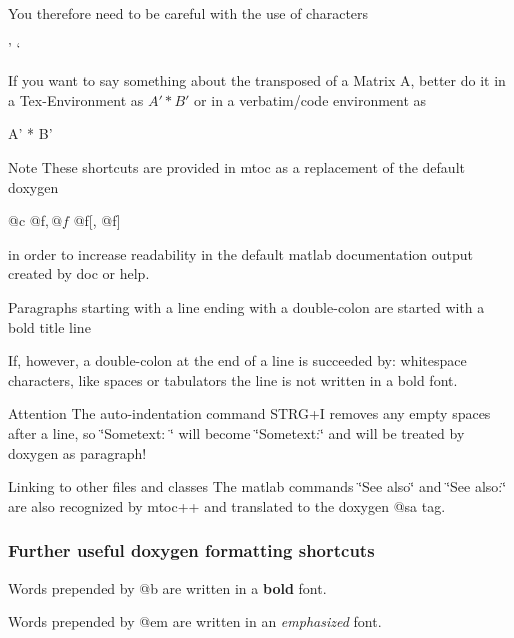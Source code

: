 You therefore need to be careful with the use of characters\begin{DoxyVerb}' `\end{DoxyVerb}
 If you want to say something about the transposed of a Matrix {\ttfamily A}, better do it in a Tex-\/\+Environment as $A' * B'$ or in a verbatim/code environment as
\begin{DoxyCode}
A\textcolor{stringliteral}{' * B'} 
\end{DoxyCode}


\begin{DoxyNote}{Note}
These shortcuts are provided in mtoc as a replacement of the default doxygen\begin{DoxyVerb}@c @f$, @f$ @f[, @f] \end{DoxyVerb}
 in order to increase readability in the default matlab documentation output created by {\ttfamily doc} or {\ttfamily help}.
\end{DoxyNote}
\begin{DoxyParagraph}{Paragraphs starting with a line ending with a double-\/colon}
are started with a bold title line
\end{DoxyParagraph}
If, however, a double-\/colon at the end of a line is succeeded by\+: whitespace characters, like spaces or tabulators the line is not written in a bold font. \begin{DoxyAttention}{Attention}
The auto-\/indentation command {\ttfamily S\+T\+R\+G+\+I} removes any empty spaces after a line, so \char`\"{}\+Sometext\+: \char`\"{} will become \char`\"{}\+Sometext\+:\char`\"{} and will be treated by doxygen as paragraph!
\end{DoxyAttention}
\begin{DoxyParagraph}{Linking to other files and classes}
The matlab commands \char`\"{}\+See also\char`\"{} and \char`\"{}\+See also\+:\char`\"{} are also recognized by mtoc++ and translated to the doxygen @sa tag.
\end{DoxyParagraph}
\hypertarget{classexamples_1_1_class_doxygen_useful}{}\subsubsection{Further useful doxygen formatting shortcuts}\label{classexamples_1_1_class_doxygen_useful}

\begin{DoxyItemize}
\item Words prepended by @b are written in a {\bfseries bold} font.
\item Words prepended by @em are written in an {\itshape emphasized} font.
\end{DoxyItemize}

